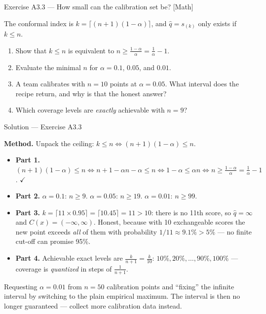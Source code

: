 \documentclass[aspectratio=169,11pt]{beamer}
\begin{document}
\begin{frame}{Exercise A3.3 --- How small can the calibration set be? [Math]}
\begin{exercise}
  The conformal index is $k = \lceil (n+1)(1-\alpha) \rceil$, and $\hat q = s_{(k)}$
  only exists if $k \le n$.
  \begin{enumerate}
    \item Show that $k \le n$ is equivalent to
          $n \ge \tfrac{1-\alpha}{\alpha} = \tfrac{1}{\alpha} - 1$.
    \item Evaluate the minimal $n$ for $\alpha = 0.1$, $0.05$, and $0.01$.
    \item A team calibrates with $n = 10$ points at $\alpha = 0.05$. What interval
          does the recipe return, and why is that the honest answer?
    \item Which coverage levels are \emph{exactly} achievable with $n = 9$?
  \end{enumerate}
\end{exercise}
\end{frame}

\begin{frame}{Solution --- Exercise A3.3}
\begin{solutionbox}
  \textbf{Method.} Unpack the ceiling: $k \le n \iff (n+1)(1-\alpha) \le n$.
  \begin{itemize}
    \item \textbf{Part 1.} $(n+1)(1-\alpha) \le n
          \iff n + 1 - \alpha n - \alpha \le n
          \iff 1 - \alpha \le \alpha n
          \iff n \ge \tfrac{1-\alpha}{\alpha} = \tfrac{1}{\alpha} - 1$. $\checkmark$
    \item \textbf{Part 2.} $\alpha = 0.1$: $n \ge 9$. \quad $\alpha = 0.05$:
          $n \ge 19$. \quad $\alpha = 0.01$: $n \ge 99$.
    \item \textbf{Part 3.} $k = \lceil 11 \times 0.95 \rceil = \lceil 10.45 \rceil
          = 11 > 10$: there is no 11th score, so
          $\hat q = \infty$ and $C(x) = (-\infty, \infty)$. Honest, because with 10
          exchangeable scores the new point exceeds \emph{all} of them with probability
          $1/11 \approx 9.1\% > 5\%$ --- no finite cut-off can promise 95\%.
    \item \textbf{Part 4.} Achievable exact levels are $\tfrac{k}{n+1} = \tfrac{k}{10}$:
          $10\%, 20\%, \dots, 90\%, 100\%$ --- coverage is \emph{quantized} in steps of
          $\tfrac{1}{n+1}$.
  \end{itemize}
\end{solutionbox}
\begin{mistake}
  Requesting $\alpha = 0.01$ from $n = 50$ calibration points and ``fixing'' the
  infinite interval by switching to the plain empirical maximum. The interval is then
  no longer guaranteed --- collect more calibration data instead.
\end{mistake}
\end{frame}
\end{document}

